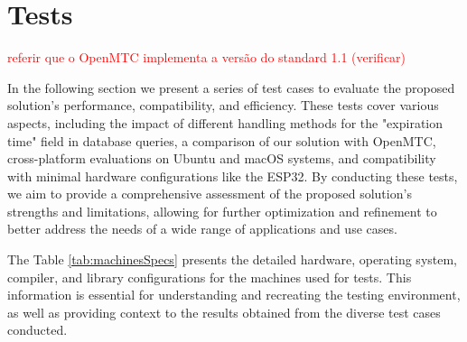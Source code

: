 \documentclass[a4paper,fleqn]{cas-dc}
\begin{document}
\section{Tests}
\label{tests}

\textcolor{red}{referir que o OpenMTC implementa a versão do standard 1.1 (verificar)}

In the following section we present a series of test cases to evaluate the proposed solution's performance, compatibility, and efficiency. These tests cover various aspects, including the impact of different handling methods for the "expiration time" field in database queries, a comparison of our solution with OpenMTC, cross-platform evaluations on Ubuntu and macOS systems, and compatibility with minimal hardware configurations like the ESP32. By conducting these tests, we aim to provide a comprehensive assessment of the proposed solution's strengths and limitations, allowing for further optimization and refinement to better address the needs of a wide range of applications and use cases.

The Table \ref{tab:machinesSpecs} presents the detailed hardware, operating system, compiler, and library configurations for the machines used for tests. This information is essential for understanding and recreating the testing environment, as well as providing context to the results obtained from the diverse test cases conducted.
\end{document}
